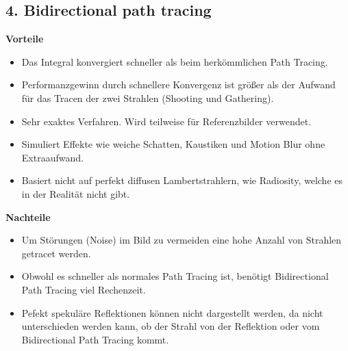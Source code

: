 \documentclass[a4paper,headings=small]{scrartcl}
\numberwithin{equation}{section} %
\numberwithin{figure}{section}   %
\begin{document}
\subsection*{4. Bidirectional path tracing}

\textbf{Vorteile}
\begin{itemize}
\item Das Integral konvergiert schneller als beim herkömmlichen Path Tracing.
\item Performanzgewinn durch schnellere Konvergenz ist größer als der Aufwand für das Tracen der zwei Strahlen (Shooting und Gathering).
\item Sehr exaktes Verfahren. Wird teilweise für Referenzbilder verwendet.
\item Simuliert Effekte wie weiche Schatten, Kaustiken und Motion Blur ohne Extraaufwand.
\item Basiert nicht auf perfekt diffusen Lambertstrahlern, wie Radiosity, welche es in der Realität nicht gibt.
\end{itemize}

\textbf{Nachteile}
\begin{itemize}
\item Um Störungen (Noise) im Bild zu vermeiden eine hohe Anzahl von Strahlen getracet werden.
\item Obwohl es schneller als normales Path Tracing ist, benötigt Bidirectional Path Tracing viel Rechenzeit.
\item Pefekt spekuläre Reflektionen können nicht dargestellt werden, da nicht unterschieden werden kann, ob der Strahl von der Reflektion oder vom Bidirectional Path Tracing kommt.
\end{itemize}
\end{document}
